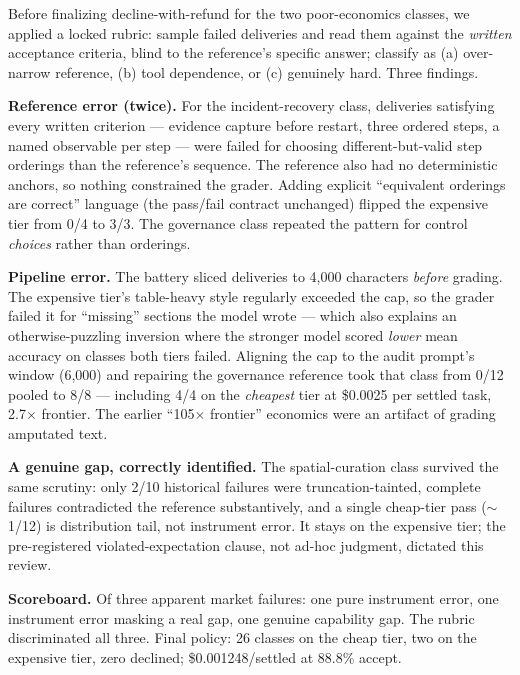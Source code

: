 \documentclass{article}
\begin{document}
Before finalizing decline-with-refund for the two poor-economics classes, we applied a locked rubric: sample failed deliveries and read them against the \emph{written} acceptance criteria, blind to the reference's specific answer; classify as (a) over-narrow reference, (b) tool dependence, or (c) genuinely hard. Three findings.

\textbf{Reference error (twice).} For the incident-recovery class, deliveries satisfying every written criterion --- evidence capture before restart, three ordered steps, a named observable per step --- were failed for choosing different-but-valid step orderings than the reference's sequence. The reference also had no deterministic anchors, so nothing constrained the grader. Adding explicit ``equivalent orderings are correct'' language (the pass/fail contract unchanged) flipped the expensive tier from 0/4 to 3/3. The governance class repeated the pattern for control \emph{choices} rather than orderings.

\textbf{Pipeline error.} The battery sliced deliveries to 4{,}000 characters \emph{before} grading. The expensive tier's table-heavy style regularly exceeded the cap, so the grader failed it for ``missing'' sections the model wrote --- which also explains an otherwise-puzzling inversion where the stronger model scored \emph{lower} mean accuracy on classes both tiers failed. Aligning the cap to the audit prompt's window (6{,}000) and repairing the governance reference took that class from 0/12 pooled to 8/8 --- including 4/4 on the \emph{cheapest} tier at \$0.0025 per settled task, 2.7$\times$ frontier. The earlier ``105$\times$ frontier'' economics were an artifact of grading amputated text.

\textbf{A genuine gap, correctly identified.} The spatial-curation class survived the same scrutiny: only 2/10 historical failures were truncation-tainted, complete failures contradicted the reference substantively, and a single cheap-tier pass ($\sim$1/12) is distribution tail, not instrument error. It stays on the expensive tier; the pre-registered violated-expectation clause, not ad-hoc judgment, dictated this review.

\textbf{Scoreboard.} Of three apparent market failures: one pure instrument error, one instrument error masking a real gap, one genuine capability gap. The rubric discriminated all three. Final policy: 26 classes on the cheap tier, two on the expensive tier, zero declined; \$0.001248/settled at 88.8\% accept.
\end{document}

